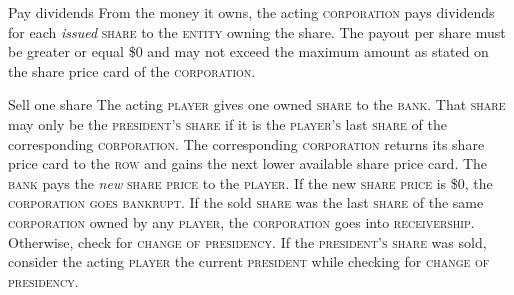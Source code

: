 \documentclass[11pt,a4paper]{article}
\newenvironment{my_description}
  {\begin{list}{}{\setlength{\labelwidth}{0pt}
   \leftmargin=1.2em
   \setlength{\itemindent}{-\leftmargin}
   \renewcommand{\makelabel}{\descriptionlabel}}
  \setlength{\itemsep}{1pt}
  \setlength{\parskip}{0pt}
  \setlength{\parsep}{0pt}
  }
  {\end{list}}
\begin{document}
\begin{multicols}{2}
{\begin{my_description}
\item[Pay dividends] From the money it owns, the acting
  \textsc{corporation} pays dividends for each \emph{issued}
  \textsc{share} to the \textsc{entity} owning the share. The payout
  per share must be greater or equal \$0 and may not exceed the
  maximum amount as stated on the share price card of the
  \textsc{corporation}.
\item[Sell one share] The acting \textsc{player} gives one owned
  \textsc{share} to the \textsc{bank}. That \textsc{share} may only be
  the \textsc{president's} \textsc{share} if it is the
  \textsc{player's} last \textsc{share} of the corresponding
  \textsc{corporation}. The corresponding \textsc{corporation} returns
  its share price card to the \textsc{row} and gains the next lower
  available share price card. The \textsc{bank} pays the \emph{new}
  \textsc{share price} to the \textsc{player}. If the new
  \textsc{share price} is \$0, the \textsc{corporation} \textsc{goes
    bankrupt}. If the sold \textsc{share} was the last \textsc{share}
  of the same \textsc{corporation} owned by any \textsc{player}, the
  \textsc{corporation} goes into \textsc{receivership}. Otherwise,
  check for \textsc{change of presidency}. If the \textsc{president's}
  \textsc{share} was sold, consider the acting \textsc{player} the
  current \textsc{president} while checking for \textsc{change of
    presidency}.
\end{my_description}

}

\end{multicols}
\end{document}
